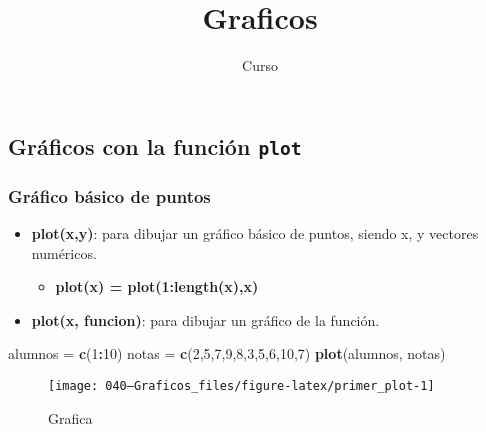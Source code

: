 \documentclass[]{article}
\title{Graficos}
\author{Curso}
\date{}
\newenvironment{Shaded}{\begin{snugshade}}{\end{snugshade}}
\newcommand{\DecValTok}[1]{\textcolor[rgb]{0.00,0.00,0.81}{#1}}
\newcommand{\KeywordTok}[1]{\textcolor[rgb]{0.13,0.29,0.53}{\textbf{#1}}}
\newcommand{\NormalTok}[1]{#1}
\newcommand{\OperatorTok}[1]{\textcolor[rgb]{0.81,0.36,0.00}{\textbf{#1}}}
\newcommand{\StringTok}[1]{\textcolor[rgb]{0.31,0.60,0.02}{#1}}
\providecommand{\tightlist}{%
  \setlength{\itemsep}{0pt}\setlength{\parskip}{0pt}}
\begin{document}
\maketitle

\hypertarget{graficos-con-la-funcion-plot}{%
\subsection{\texorpdfstring{Gráficos con la función
\texttt{plot}}{Gráficos con la función plot}}\label{graficos-con-la-funcion-plot}}

\hypertarget{grafico-basico-de-puntos}{%
\subsubsection{Gráfico básico de
puntos}\label{grafico-basico-de-puntos}}

\begin{itemize}
\tightlist
\item
  \textbf{plot(x,y)}: para dibujar un gráfico básico de puntos, siendo
  x, y vectores numéricos.

  \begin{itemize}
  \tightlist
  \item
    \textbf{plot(x) = plot(1:length(x),x)}
  \end{itemize}
\item
  \textbf{plot(x, funcion)}: para dibujar un gráfico de la función.
\end{itemize}

\begin{Shaded}
\begin{Highlighting}[]
\NormalTok{alumnos =}\StringTok{ }\KeywordTok{c}\NormalTok{(}\DecValTok{1}\OperatorTok{:}\DecValTok{10}\NormalTok{)}
\NormalTok{notas =}\StringTok{ }\KeywordTok{c}\NormalTok{(}\DecValTok{2}\NormalTok{,}\DecValTok{5}\NormalTok{,}\DecValTok{7}\NormalTok{,}\DecValTok{9}\NormalTok{,}\DecValTok{8}\NormalTok{,}\DecValTok{3}\NormalTok{,}\DecValTok{5}\NormalTok{,}\DecValTok{6}\NormalTok{,}\DecValTok{10}\NormalTok{,}\DecValTok{7}\NormalTok{)}
\KeywordTok{plot}\NormalTok{(alumnos, notas)}
\end{Highlighting}
\end{Shaded}

\begin{figure}

{\centering \texttt{[image: 040---Graficos\_files/figure-latex/primer\_plot-1]} 

}

\caption{Grafica}\label{fig:primer_plot}
\end{figure}
\end{document}
